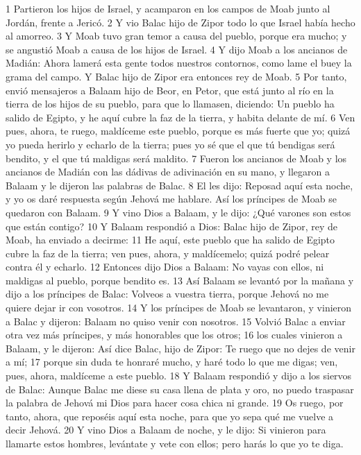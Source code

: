 1 Partieron los hijos de Israel, y acamparon en los campos de Moab junto al Jordán, frente a Jericó. 
2 Y vio Balac hijo de Zipor todo lo que Israel había hecho al amorreo.
3 Y Moab tuvo gran temor a causa del pueblo, porque era mucho; y se angustió Moab a causa de los hijos de Israel.
4 Y dijo Moab a los ancianos de Madián: Ahora lamerá esta gente todos nuestros contornos, como lame el buey la grama del campo. Y Balac hijo de Zipor era entonces rey de Moab. 
5 Por tanto, envió mensajeros a Balaam hijo de Beor, en Petor, que está junto al río en la tierra de los hijos de su pueblo, para que lo llamasen, diciendo: Un pueblo ha salido de Egipto, y he aquí cubre la faz de la tierra, y habita delante de mí.
6 Ven pues, ahora, te ruego, maldíceme este pueblo, porque es más fuerte que yo; quizá yo pueda herirlo y echarlo de la tierra; pues yo sé que el que tú bendigas será bendito, y el que tú maldigas será maldito.
7 Fueron los ancianos de Moab y los ancianos de Madián con las dádivas de adivinación en su mano, y llegaron a Balaam y le dijeron las palabras de Balac.
8 El les dijo: Reposad aquí esta noche, y yo os daré respuesta según Jehová me hablare. Así los príncipes de Moab se quedaron con Balaam.
9 Y vino Dios a Balaam, y le dijo: ¿Qué varones son estos que están contigo?
10 Y Balaam respondió a Dios: Balac hijo de Zipor, rey de Moab, ha enviado a decirme:
11 He aquí, este pueblo que ha salido de Egipto cubre la faz de la tierra; ven pues, ahora, y maldícemelo; quizá podré pelear contra él y echarlo.
12 Entonces dijo Dios a Balaam: No vayas con ellos, ni maldigas al pueblo, porque bendito es.
13 Así Balaam se levantó por la mañana y dijo a los príncipes de Balac: Volveos a vuestra tierra, porque Jehová no me quiere dejar ir con vosotros.
14 Y los príncipes de Moab se levantaron, y vinieron a Balac y dijeron: Balaam no quiso venir con nosotros.
15 Volvió Balac a enviar otra vez más príncipes, y más honorables que los otros;
16 los cuales vinieron a Balaam, y le dijeron: Así dice Balac, hijo de Zipor: Te ruego que no dejes de venir a mí;
17 porque sin duda te honraré mucho, y haré todo lo que me digas; ven, pues, ahora, maldíceme a este pueblo. 
18 Y Balaam respondió y dijo a los siervos de Balac: Aunque Balac me diese su casa llena de plata y oro, no puedo traspasar la palabra de Jehová mi Dios para hacer cosa chica ni grande.
19 Os ruego, por tanto, ahora, que reposéis aquí esta noche, para que yo sepa qué me vuelve a decir Jehová.
20 Y vino Dios a Balaam de noche, y le dijo: Si vinieron para llamarte estos hombres, levántate y vete con ellos; pero harás lo que yo te diga.
